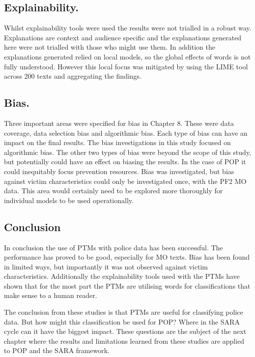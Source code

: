 \subsection{Explainability.} Whilst explainability tools were used the results were not trialled in a robust way. Explanations are context and audience specific and the explanations generated here were not trialled with those who might use them. In addition the explanations generated relied on local models, so the global effects of words is not fully understood. However this local focus was mitigated by using the LIME tool across 200 texts and aggregating the findings. 

\subsection{Bias.} Three important areas were specified for bias in Chapter 8. These were data coverage, data selection bias and algorithmic bias. Each type of bias can have an impact on the final results. The bias investigations in this study focused on algorithmic bias. The other two types of bias were beyond the scope of this study, but potentially could have an effect on biasing the results. In the case of POP it could inequitably focus prevention resources. Bias was investigated, but bias against victim characteristics could only be investigated once, with the PF2 MO data. This area would certainly need to be explored more thoroughly for individual models to be used operationally. 


\subsection{Conclusion} In conclusion the use of PTMs with police data has been successful. The performance has proved to be good, especially for MO texts. Bias has been found in limited ways, but importantly it was not observed against victim characteristics. Additionally the explainability tools used with the PTMs have shown that for the most part the PTMs are utilising words for classifications that make sense to a human reader.

The conclusion from these studies is that PTMs are useful for classifying police data. But how might this classification be used for POP? Where in the SARA cycle can it have the biggest impact. These questions are the subject of the next chapter where the results and limitations learned from these studies are applied to POP and the SARA framework.

